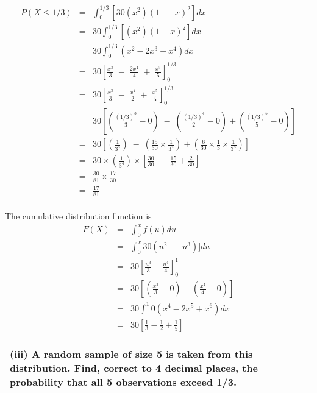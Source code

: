 \documentclass[a4paper,30pt]{article}
\begin{document}
\begin{enumerate}
{
\large
\begin{eqnarray*}
P(X \leq 1/3 ) &=& \int^{1/3}_{0} [30(x^2)(1\;-\;x)^2] dx \\
&=& 30 \int^{1/3}_{0}  \left[(x^2)(1-x)^2\right] dx\\
&=& 30 \int^{1/3}_{0} (x^2 -2x^3 + x^4) dx\\
&=& 30 \left[ \frac{x^3}{3}  \;-\;  \frac{2x^4}{4} \; + \; \frac{x^5}{5}  \right]^{1/3}_{0}\\
&=& 30 \left[ \frac{x^3}{3}  \;-\;  \frac{x^4}{2} \; + \; \frac{x^5}{5}  \right]^{1/3}_{0}\\
&=& 30 \left[ \left( \frac{(1/3)^3}{3}- 0 \right) \;-\; \left( \frac{(1/3)^4}{2}- 0 \right) +  \left( \frac{(1/3)^5}{5}- 0 \right) \right]\\
&=& 30 \left[ \left( \frac{1}{3^4} \right) \;-\; \left( \frac{15}{30} \times \frac{1}{3^4} \right) +  \left( \frac{6}{30} \times \frac{1}{3}\times \frac{1}{3^4} \right) \right]\\
&=& 30 \times \left( \frac{1}{3^4} \right) \times \left[ \frac{30}{30} \;-\;  \frac{15}{30}  + \frac{2}{30}  \right]\\
&=&  \frac{30}{81} \times \frac{17}{30} \\
&=&  \frac{17}{81}\\
\end{eqnarray*}
}

The cumulative distribution function is
\begin{eqnarray*}
F(X) &=& \int^{x}_{0} f(u) du \\
&=& \int^{x}_{0} 30(u^2\;-\;u^3)] du \\
&=& 30 \left[ \frac{u^3}{3} - \frac{u^4}{4}\right]^1_0\\
&=& 30 \left[ \left( \frac{x^3}{3}- 0 \right) - \left( \frac{x^4}{4}- 0 \right)  \right]\\
&=& 30 \int^{1}{0} (x^4 -2x^5 + x^6) dx\\
&=& 30 \left[  \frac{1}{3} - \frac{1}{2} + \frac{1}{5}\right]
\end{eqnarray*}
\newpage

\begin{table}[ht!]
     \centering
     \begin{tabular}{|p{15cm}|}
     \hline        
\noindent 
(iii) A random sample of size 5 is taken from this distribution. Find, correct to 4 decimal places, the probability that all 5 observations exceed 1/3.


\\ \hline
      \end{tabular}
    \end{table}
    





\end{enumerate}
\end{document}
